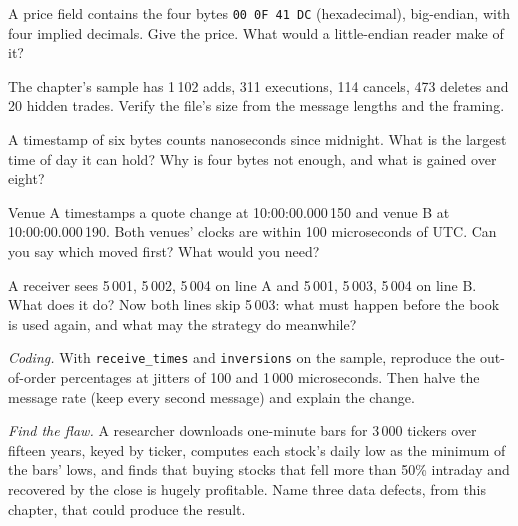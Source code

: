 \begin{exercise}[$\star$]\label{exo:m1:reading-market-data:2}
A price field contains the four bytes \texttt{00 0F 41 DC} (hexadecimal),
big-endian, with four implied decimals. Give the price. What would a
little-endian reader make of it?
\end{exercise}

\begin{exercise}[$\star$]\label{exo:m1:reading-market-data:3}
The chapter's sample has 1\,102 adds, 311 executions, 114 cancels, 473 deletes
and 20 hidden trades. Verify the file's size from the message lengths and
the framing.
\end{exercise}

\begin{exercise}[$\star\star$]\label{exo:m1:reading-market-data:4}
A timestamp of six bytes counts nanoseconds since midnight. What is the
largest time of day it can hold? Why is four bytes not enough, and what is
gained over eight?
\end{exercise}

\begin{exercise}[$\star\star$]\label{exo:m1:reading-market-data:5}
Venue A timestamps a quote change at 10:00:00.000\,150 and venue B at
10:00:00.000\,190. Both venues' clocks are within 100 microseconds of UTC.
Can you say which moved first? What would you need?
\end{exercise}

\begin{exercise}[$\star\star$]\label{exo:m1:reading-market-data:6}
A receiver sees  5\,001, 5\,002, 5\,004 on line A and 5\,001,
5\,003, 5\,004 on line B. What does it do? Now both lines skip 5\,003: what
must happen before the book is used again, and what may the strategy do
meanwhile?
\end{exercise}

\begin{exercise}[$\star\star\star$]\label{exo:m1:reading-market-data:7}
\emph{Coding.} With \texttt{receive\_times} and \texttt{inversions} on the
sample, reproduce the out-of-order percentages at jitters of 100 and 1\,000
microseconds. Then halve the message rate (keep every second message) and
explain the change.
\end{exercise}

\begin{exercise}[$\star\star\star$]\label{exo:m1:reading-market-data:8}
\emph{Find the flaw.} A researcher downloads one-minute bars for 3\,000
tickers over fifteen years, keyed by ticker, computes each stock's daily low
as the minimum of the bars' lows, and finds that buying stocks that fell more
than 50\% intraday and recovered by the close is hugely profitable. Name
three data defects, from this chapter, that could produce the result.
\end{exercise}

